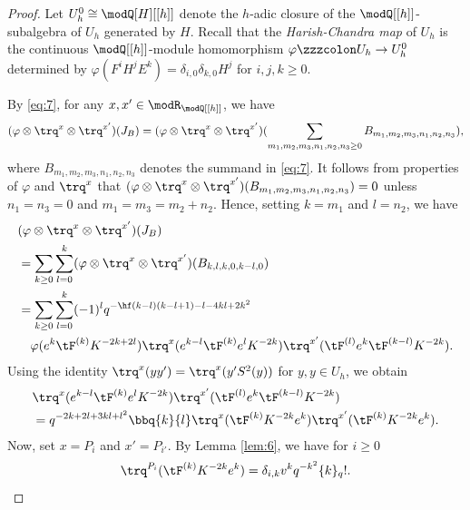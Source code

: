 \documentclass{amsart}
\numberwithin{equation}{section}
\numberwithin{figure}{section}
\theoremstyle{plain}
\theoremstyle{definition}
\theoremstyle{remark}
\begin{document}
\begin{proof}
  Let $U_h^0\cong\modQ [H][[h]]$ denote the $h$-adic closure of the
  $\modQ [[h]]$-subalgebra of $U_h$ generated by $H$.  Recall that the
  {\em Harish-Chandra map} of $U_h$ is the continuous $\modQ [[h]]$-module
  homomorphism $\varphi\zzzcolon U_h \rightarrow  U_h^0$ determined by
  $\varphi(F^iH^jE^k)=\delta _{i,0}\delta _{k,0}H^j$ for $i,j,k\ge 0$.

  By \eqref{eq:7}, for any $x,x'\in \modR _{\modQ [[h]]}$, we have
  \begin{equation*}
    (\varphi\otimes \trq^x\otimes \trq^{x'})(J_B)
       =(\varphi\otimes \trq^x\otimes \trq^{x'})
      (\sum_{m_1,m_2,m_3,n_1,n_2,n_3\ge 0}
	B_{m_1,m_2,m_3,n_1,n_2,n_3}),
  \end{equation*}
  where $B_{m_1,m_2,m_3,n_1,n_2,n_3}$ denotes the summand in
  \eqref{eq:7}.  It follows from properties of $\varphi$ and $\trq^x$
  that $(\varphi\otimes \trq^x\otimes \trq^{x'})(B_{m_1,m_2,m_3,n_1,n_2,n_3})=0$
  unless $n_1=n_3=0$ and $m_1=m_3=m_2+n_2$.  Hence, setting $k=m_1$
  and $l=n_2$, we have
  \begin{equation*}
    \begin{split}
      &(\varphi\otimes \trq^x\otimes \trq^{x'})(J_B)\\
      &=\sum_{k\ge 0}\sum_{l=0}^k
      (\varphi\otimes \trq^x\otimes \trq^{x'})(B_{k,l,k,0,k-l,0})\\
      &=\sum_{k\ge 0}\sum_{l=0}^k
      (-1)^{l}	q^{ -\hf (k-l)(k-l+1)-l -4kl+2k^2 }\\
	&\quad
	\varphi(e^k   \tF^{(k)} K^{-2k+2l})
	\trq^x(e^{k-l}    \tF^{(k)} e^lK^{-2k})
	\trq^{x'}(\tF^{(l)} e^k    \tF^{(k-l)}K^{-2k} ).
    \end{split}
  \end{equation*}
  Using the identity $\trq^x(yy')=\trq^x(y'S^2(y))$ for $y,y\in U_h$, we
  obtain
  \begin{equation*}
    \begin{split}
      &\trq^x(e^{k-l}    \tF^{(k)} e^lK^{-2k})
      \trq^{x'}(\tF^{(l)} e^k    \tF^{(k-l)}K^{-2k} )\\
      &=q^{-2k+2l+3kl+l^2}\bbq{k}{l}
      \trq^x(\tF^{(k)}K^{-2k}e^k)
      \trq^{x'}(\tF^{(k)}K^{-2k}e^k).
    \end{split}
  \end{equation*}
  Now, set $x=P_{i}$ and $x'=P_{i'}$.  By Lemma \ref{lem:6}, we
  have for $i\ge 0$
  \begin{equation*}
      \trq^{P_i}(\tF^{(k)}K^{-2k}e^k)
      =\delta _{i,k}v^{k} q^{-k^2} \{k\}_q!.

\end{equation*}
\end{proof}
\end{document}
